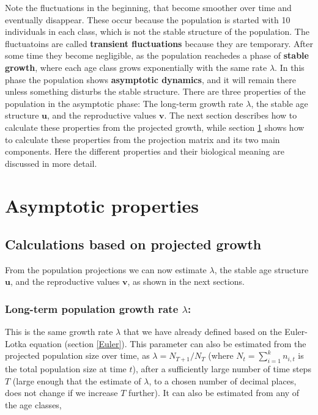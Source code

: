 \documentclass[
]{book}
\begin{document}
Note the fluctuations in the beginning, that become smoother over time and eventually disappear. These occur because the population is started with 10 individuals in each class, which is not the stable structure of the population. The fluctuatoins are called \textbf{transient fluctuations} because they are temporary. After some time they become negligible, as the population reachedes a phase of \textbf{stable growth}, where each age class grows exponentially with the same rate \(\lambda\). In this phase the population shows \textbf{asymptotic dynamics}, and it will remain there unless something disturbs the stable structure. There are three properties of the population in the asymptotic phase: The long-term growth rate \(\lambda\), the stable age structure \(\mathbf{u}\), and the reproductive values \(\mathbf{v}\). The next section describes how to calculate these properties from the projected growth, while section \ref{asymptotic} shows how to calculate these properties from the projection matrix and its two main components. Here the different properties and their biological meaning are discussed in more detail.

\hypertarget{asymptotic}{%
\section{Asymptotic properties}\label{asymptotic}}

\hypertarget{projected}{%
\subsection{Calculations based on projected growth}\label{projected}}

From the population projections we can now estimate \(\lambda\), the stable age structure \(\mathbf{u}\), and the reproductive values \(\mathbf{v}\), as shown in the next sections.

\hypertarget{long-term-population-growth-rate-lambda}{%
\subsubsection*{\texorpdfstring{Long-term population growth rate \(\lambda\):}{Long-term population growth rate \textbackslash lambda:}}\label{long-term-population-growth-rate-lambda}}

This is the same growth rate \(\lambda\) that we have already defined based on the Euler-Lotka equation (section \ref{Euler}). This parameter can also be estimated from the projected population size over time, as \(\lambda=N_{T+1}/N_T\) (where \(N_t=\sum_{i=1}^kn_{i,t}\) is the total population size at time \(t\)), after a sufficiently large number of time steps \(T\) (large enough that the estimate of \(\lambda\), to a chosen number of decimal places, does not change if we increase \(T\) further). It can also be estimated from any of the age classes,
\end{document}
